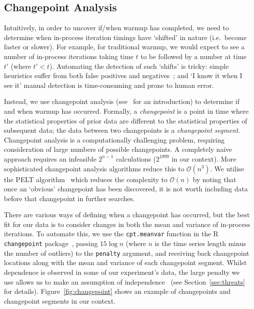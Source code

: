 \documentclass[acmsmall,screen]{acmart}
\begin{document}
\subsection{Changepoint Analysis}

Intuitively, in order to uncover if/when warmup has completed, we need to
determine when in-process iteration timings have `shifted' in nature (i.e.~become
faster or slower). For example, for traditional warmup, we would expect to see a
number of in-process iterations taking time $t$ to be followed by a number at
time $t'$ (where $t' < t$). Automating the detection of such `shifts' is
tricky: simple heuristics suffer from both false positives and negatives~\cite{kalibera13rigorous}; and
`I know it when I see it' manual detection is time-consuming and prone to human
error.

Instead, we use changepoint analysis (see~\citet{eckley11analysis} for an
introduction) to determine if and when warmup has occurred. Formally, a
\emph{changepoint} is a point in time where the statistical properties of prior
data are different to the statistical properties of subsequent data; the data
between two changepoints is a \emph{changepoint segment}.
Changepoint analysis is a computationally challenging problem, requiring
consideration of large numbers of possible changepoints. A completely naive
approach requires an infeasible $2^{n-1}$ calculations ($2^{1999}$ in our context).
More sophisticated changepoint analysis algorithms reduce this to $\mathcal{O}(n^3)$.
We utilise the PELT algorithm~\cite{killick12optimal} which reduces the
complexity to $\mathcal{O}(n)$ by noting that once an
`obvious' changepoint has been discovered, it is not worth including
data before that changepoint in further searches.

There are various ways of defining when a changepoint has occurred, but the best fit
for our data is to consider changes in both the mean and variance of in-process
iterations. To automate this, we use the \texttt{cpt.meanvar} function in the R
\texttt{changepoint} package~\cite{killick14changepoint}, passing $15\log{n}$ (where
$n$ is the time series length minus the number of outliers) to the
\texttt{penalty} argument, and receiving back changepoint locations along with the mean and variance
of each changepoint segment. Whilst dependence is observed in some of
our experiment's data, the large penalty we use allows us to make an assumption
of independence~\cite{antoch97effect} (see Section~\ref{sec:threats} for details).
Figure~\ref{fig:changepoint} shows an example of changepoints and
changepoint segments in our context.
\end{document}
